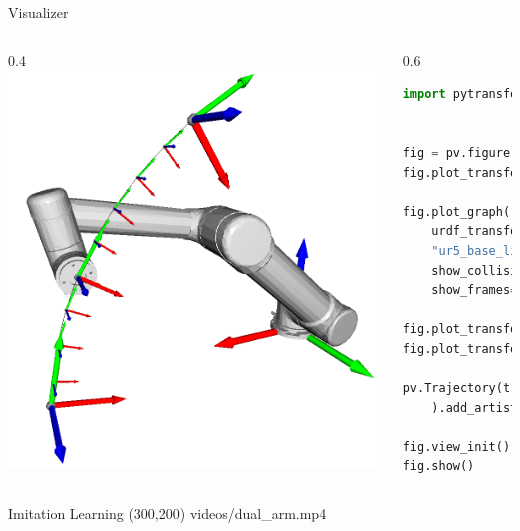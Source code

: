 \documentclass[14pt]{beamer}
\begin{document}
\begin{frame}[fragile]{Visualizer}
\begin{columns}
\begin{column}{0.4\textwidth}
\includegraphics[width=\textwidth]{images/movement_primitives_cart_dmp_ur5}
\end{column}
\begin{column}{0.6\textwidth}
\begin{lstlisting}[language=Python]
import pytransform3d.visualizer as pv


fig = pv.figure()
fig.plot_transform(s=0.3)

fig.plot_graph(
    urdf_transform_manager,
    "ur5_base_link",
    show_collision_objects=True,
    show_frames=True)

fig.plot_transform(ee2base_start)
fig.plot_transform(ee2base_end)

pv.Trajectory(trajectory
    ).add_artist(fig)

fig.view_init()
fig.show()
\end{lstlisting}
\end{column}
\end{columns}
\end{frame}

\begin{frame}[fragile]{Imitation Learning}
\makebox(300,200){
{videos/dual_arm.mp4}}
\end{frame}
\end{document}
